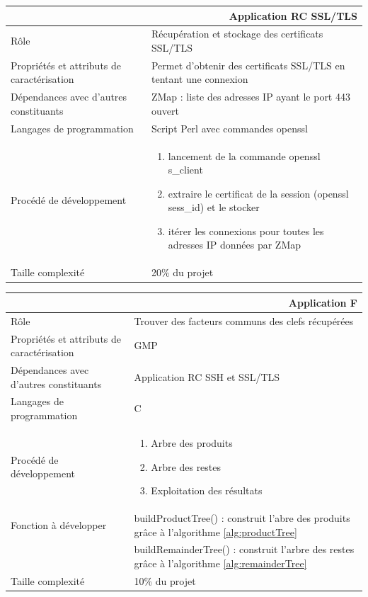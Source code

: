 \documentclass[a4paper,11pt,french]{article}
\begin{document}
\begin{center}
	\vspace*{0.7cm}
	\begin{tabularx}{16cm}{|l|X|}
	\hline
	\multicolumn{2}{|r|}{\textbf{Application RC SSL/TLS}}\\
	\hline
	R\^ole & Récupération et stockage des certificats SSL/TLS \\
	\hline
	Propriétés et attributs de caractérisation & Permet d'obtenir des certificats SSL/TLS en tentant une connexion  \\
	\hline
	Dépendances avec d'autres constituants & ZMap : liste des adresses IP ayant le port 443 ouvert\\
	\hline
	Langages de programmation & Script Perl avec commandes openssl \\
	\hline
	Procédé de développement & \begin{enumerate} \item lancement de la commande openssl s\_client \item extraire le certificat de la session (openssl sess\_id) et le stocker \item itérer les connexions pour toutes les adresses IP données par ZMap \end{enumerate} \\
	\hline
	Taille complexité & 20\% du projet\\
	\hline
	\end{tabularx}
\end{center}


\begin{center}
	\vspace*{0.7cm}
	\begin{tabularx}{16cm}{|l|X|}
	\hline
	\multicolumn{2}{|r|}{\textbf{Application F}}\\
	\hline
	R\^ole & Trouver des facteurs communs des clefs récupérées\\
	\hline
	Propriétés et attributs de caractérisation & GMP\\
	\hline
	Dépendances avec d'autres constituants & Application RC SSH et SSL/TLS\\
	\hline
	Langages de programmation & C\\
	\hline
	Procédé de développement & \begin{enumerate} \item Arbre des produits \item Arbre des restes \item Exploitation des résultats \end{enumerate}\\
	\hline
	Fonction à développer & buildProductTree() : construit l'abre des produits grâce à l'algorithme \ref{alg:productTree}\\
	& buildRemainderTree() : construit l'arbre des restes grâce à l'algorithme \ref{alg:remainderTree}\\
	\hline
	Taille complexité & 10\% du projet\\
	\hline
	\end{tabularx}
\end{center}
\end{document}
